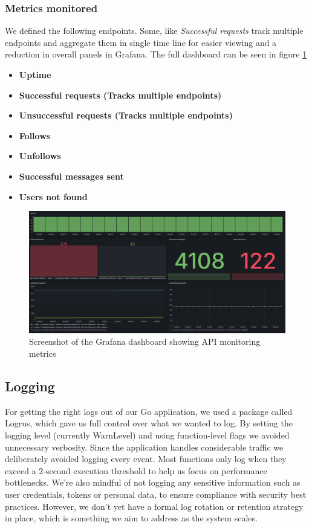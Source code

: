 \subsubsection{Metrics monitored}
We defined the following endpoints. Some, like \textit{Successful requests} track multiple endpoints and aggregate them in single time line for easier viewing and a reduction in overall panels in Grafana. The full dashboard can be seen in figure \ref{fig:dashboard}
\begin{itemize}
    \item \textbf{Uptime}
    \item \textbf{Successful requests (Tracks multiple endpoints)}
    \item \textbf{Unsuccessful requests (Tracks multiple endpoints)}
    \item \textbf{Follows}
    \item \textbf{Unfollows}
    \item \textbf{Successful messages sent}
    \item \textbf{Users not found}
\end{itemize}

\begin{figure} [!htb]
    \centering
    \includegraphics[width=1.0\linewidth]{Images/Grafana_dashboard.png}
    \caption{Screenshot of the Grafana dashboard showing API monitoring metrics}
    \label{fig:dashboard}
\end{figure}

\subsection{Logging}
\label{sec:logging}
For getting the right logs out of our Go application, we used a package called Logrus, which gave us full control over what we wanted to log. By setting the logging level (currently WarnLevel) and using function-level flags we avoided unnecessary verbosity. Since the application handles considerable traffic we deliberately avoided logging every event. Most functions only log when they exceed a 2-second execution threshold to help us focus on performance bottlenecks. We’re also mindful of not logging any sensitive information such as user credentials, tokens or personal data, to ensure compliance with security best practices. However, we don’t yet have a formal log rotation or retention strategy in place, which is something we aim to address as the system scales.\\\\ 


